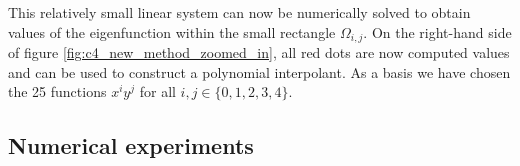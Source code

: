 This relatively small linear system can now be numerically solved to obtain values of the eigenfunction within the small rectangle $\Omega_{i,j}$. On the right-hand side of figure \ref{fig:c4_new_method_zoomed_in}, all red dots are now computed values and can be used to construct a polynomial interpolant. As a basis we have chosen the 25 functions $x^i y^j$ for all $i,j \in \{0,1,2,3,4\}$.










\subsection{Numerical experiments}\label{sec:c4_numerical_experiments}

